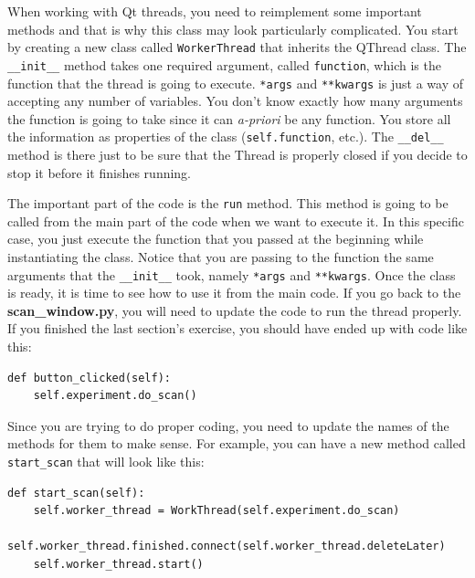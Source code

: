 When working with Qt threads, you need to reimplement some important
methods and that is why this class may look particularly complicated.
You start by creating a new class called \texttt{WorkerThread} that
inherits the QThread class. The \texttt{__init__} method takes one
required argument, called \texttt{function}, which is the function that
the thread is going to execute. \texttt{*args} and \texttt{**kwargs} is
just a way of accepting any number of variables. You don't know exactly
how many arguments the function is going to take since it can
\emph{a-priori} be any function. You store all the information as
properties of the class (\texttt{self.function}, etc.). The
\texttt{__del__} method is there just to be sure that the Thread is
properly closed if you decide to stop it before it finishes running.

The important part of the code is the \texttt{run} method. This method
is going to be called from the main part of the code when we want to
execute it. In this specific case, you just execute the function that
you passed at the beginning while instantiating the class. Notice that
you are passing to the function the same arguments that the
\texttt{__init__} took, namely \texttt{*args} and \texttt{**kwargs}.
Once the class is ready, it is time to see how to use it from the main
code. If you go back to the \textbf{scan\_window.py}, you will need to
update the code to run the thread properly. If you finished the last
section's exercise, you should have ended up with code like this:

\begin{verbatim}
def button_clicked(self):
    self.experiment.do_scan()
\end{verbatim}

Since you are trying to do proper coding, you need to update the names
of the methods for them to make sense. For example, you can have a new
method called \texttt{start_scan} that will look like this:

\begin{verbatim}
def start_scan(self):
    self.worker_thread = WorkThread(self.experiment.do_scan)
    self.worker_thread.finished.connect(self.worker_thread.deleteLater)
    self.worker_thread.start()
\end{verbatim}

